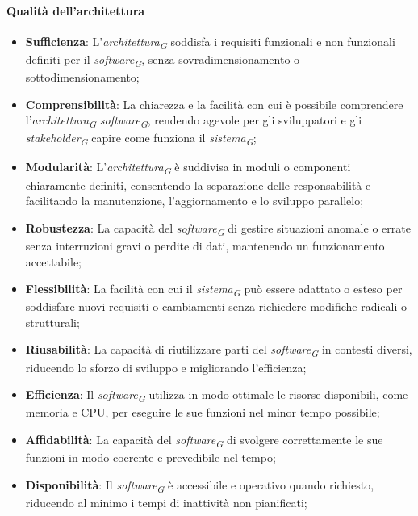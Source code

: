 \paragraph{Qualità dell'architettura}
\begin{itemize}
    \item \textbf{Sufficienza}: L'\textit{architettura}\textsubscript{\textit{G}} soddisfa i requisiti funzionali e non funzionali definiti per il \textit{software}\textsubscript{\textit{G}}, senza sovradimensionamento o sottodimensionamento;
    \item \textbf{Comprensibilità}: La chiarezza e la facilità con cui è possibile comprendere l'\textit{architettura}\textsubscript{\textit{G}} \textit{software}\textsubscript{\textit{G}}, rendendo agevole per gli sviluppatori e gli \textit{stakeholder}\textsubscript{\textit{G}} capire come funziona il \textit{sistema}\textsubscript{\textit{G}};
    \item \textbf{Modularità}: L'\textit{architettura}\textsubscript{\textit{G}} è suddivisa in moduli o componenti chiaramente definiti, consentendo la separazione delle responsabilità e facilitando la manutenzione, l'aggiornamento e lo sviluppo parallelo;
    \item \textbf{Robustezza}: La capacità del \textit{software}\textsubscript{\textit{G}} di gestire situazioni anomale o errate senza interruzioni gravi o perdite di dati, mantenendo un funzionamento accettabile;
    \item \textbf{Flessibilità}: La facilità con cui il \textit{sistema}\textsubscript{\textit{G}} può essere adattato o esteso per soddisfare nuovi requisiti o cambiamenti senza richiedere modifiche radicali o strutturali;
    \item \textbf{Riusabilità}: La capacità di riutilizzare parti del \textit{software}\textsubscript{\textit{G}} in contesti diversi, riducendo lo sforzo di sviluppo e migliorando l'efficienza;
    \item \textbf{Efficienza}: Il \textit{software}\textsubscript{\textit{G}} utilizza in modo ottimale le risorse disponibili, come memoria e CPU, per eseguire le sue funzioni nel minor tempo possibile;
    \item \textbf{Affidabilità}: La capacità del \textit{software}\textsubscript{\textit{G}} di svolgere correttamente le sue funzioni in modo coerente e prevedibile nel tempo;
    \item \textbf{Disponibilità}: Il \textit{software}\textsubscript{\textit{G}} è accessibile e operativo quando richiesto, riducendo al minimo i tempi di inattività non pianificati;

\end{itemize}
